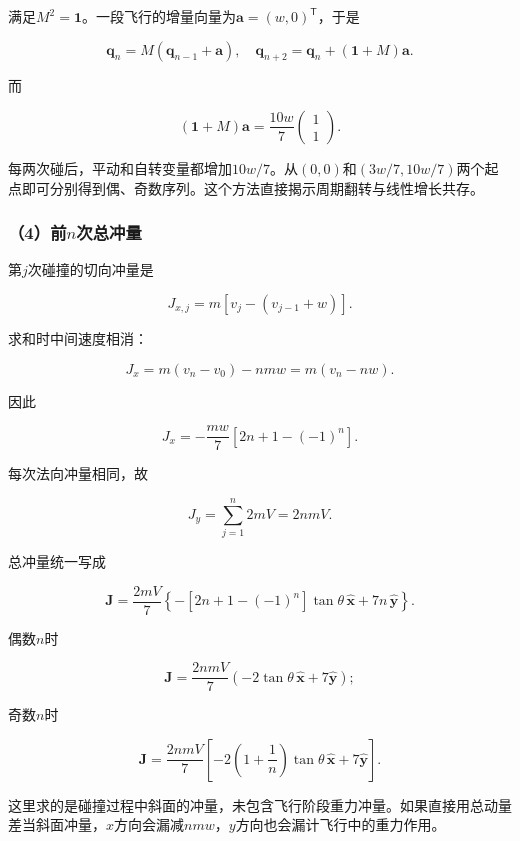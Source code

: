 \documentclass[12pt,a4paper,fontset=fandol]{ctexart}
\begin{document}
满足\(M^2=\mathbf1\)。一段飞行的增量向量为\(\boldsymbol a=(w,0)^{\mathsf T}\)，于是

\[
\boldsymbol q_n=M(\boldsymbol q_{n-1}+\boldsymbol a),
\quad
\boldsymbol q_{n+2}=\boldsymbol q_n+(\mathbf1+M)\boldsymbol a.
\]

而

\[
(\mathbf1+M)\boldsymbol a
=\frac{10w}{7}\begin{pmatrix}1\\1\end{pmatrix}.
\]

每两次碰后，平动和自转变量都增加\(10w/7\)。从\((0,0)\)和\((3w/7,10w/7)\)两个起点即可分别得到偶、奇数序列。这个方法直接揭示周期翻转与线性增长共存。

\subsubsection{\texorpdfstring{（4）前\(n\)次总冲量}{（4）前n次总冲量}}\label{ux524dnux6b21ux603bux51b2ux91cf}

第\(j\)次碰撞的切向冲量是

\[
J_{x,j}=m[v_j-(v_{j-1}+w)].
\]

求和时中间速度相消：

\[
J_x=m(v_n-v_0)-nmw=m(v_n-nw).
\]

因此

\[
J_x=-\frac{mw}{7}[2n+1-(-1)^n].
\]

每次法向冲量相同，故

\[
J_y=\sum_{j=1}^n2mV=2nmV.
\]

总冲量统一写成

\[
\boxed{
\boldsymbol J=\frac{2mV}{7}
\left\{-[2n+1-(-1)^n]\tan\theta\,
\hat{\boldsymbol x}+7n\,\hat{\boldsymbol y}\right\}}.
\]

偶数\(n\)时

\[
\boldsymbol J=\frac{2nmV}{7}
(-2\tan\theta\,\hat{\boldsymbol x}+7\hat{\boldsymbol y});
\]

奇数\(n\)时

\[
\boldsymbol J=\frac{2nmV}{7}
\left[-2\left(1+\frac1n\right)\tan\theta\,
\hat{\boldsymbol x}+7\hat{\boldsymbol y}\right].
\]

这里求的是碰撞过程中斜面的冲量，未包含飞行阶段重力冲量。如果直接用总动量差当斜面冲量，\(x\)方向会漏减\(nmw\)，\(y\)方向也会漏计飞行中的重力作用。
\end{document}
